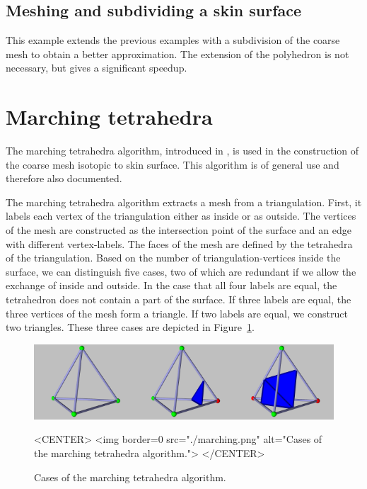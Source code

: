 \subsection{Meshing and subdividing a skin surface}
This example extends the previous examples with a subdivision of the
coarse mesh to obtain a better approximation. The extension of the
polyhedron is not necessary, but gives a significant speedup.



\section{Marching tetrahedra}
The marching tetrahedra algorithm, introduced in
\cite{cgal:tpg-rmtiise-99}, is used in the construction of the coarse
mesh isotopic to skin surface. This algorithm is of general use and
therefore also documented.

The marching tetrahedra algorithm extracts a mesh from a
triangulation.  First, it labels each vertex of the triangulation
either as inside or as outside. The vertices of the mesh are
constructed as the intersection point of the surface and an edge with
different vertex-labels. The faces of the mesh are defined by the
tetrahedra of the triangulation. Based on the number of
triangulation-vertices inside the surface, we can distinguish five
cases, two of which are redundant if we allow the exchange of inside
and outside. In the case that all four labels are equal, the
tetrahedron does not contain a part of the surface. If three labels
are equal, the three vertices of the mesh form a triangle. If two
labels are equal, we construct two triangles. These three cases are
depicted in Figure~\ref{SkinSurface3-fig-marching}.

\begin{figure}
\begin{ccTexOnly}
\begin{center}
\includegraphics[width=.8\textwidth]{Skin_surface_3/marching}
\end{center}
\end{ccTexOnly}
\begin{ccHtmlOnly}
<CENTER>
<img border=0 src="./marching.png"
alt="Cases of the marching tetrahedra algorithm.">
</CENTER>
\end{ccHtmlOnly}

\caption{\label{SkinSurface3-fig-marching} Cases of the marching
  tetrahedra algorithm.}
\end{figure}

